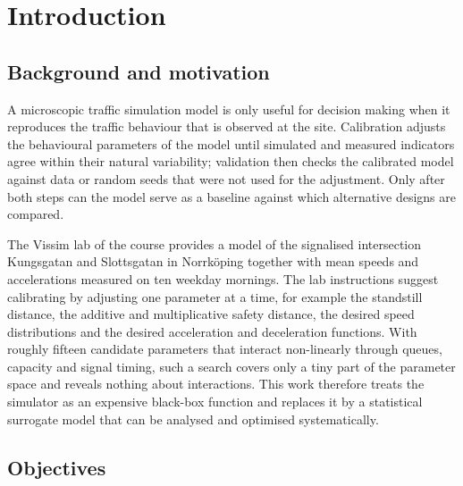\documentclass[11pt,a4paper]{article}
\begin{document}
\tableofcontents
\listoffigures
\listoftables
\newpage

\section{Introduction}
\label{sec:intro}

\subsection{Background and motivation}

A microscopic traffic simulation model is only useful for decision making when it reproduces the
traffic behaviour that is observed at the site. Calibration adjusts the behavioural parameters of
the model until simulated and measured indicators agree within their natural variability;
validation then checks the calibrated model against data or random seeds that were not used for
the adjustment. Only after both steps can the model serve as a baseline against which alternative
designs are compared.

The Vissim lab of the course provides a model of the signalised intersection Kungsgatan and
Slottsgatan in Norrk\"oping together with mean speeds and accelerations measured on ten weekday
mornings. The lab instructions suggest calibrating by adjusting one parameter at a time, for
example the standstill distance, the additive and multiplicative safety distance, the desired speed
distributions and the desired acceleration and deceleration functions. With roughly fifteen
candidate parameters that interact non-linearly through queues, capacity and signal timing, such a
search covers only a tiny part of the parameter space and reveals nothing about interactions. This
work therefore treats the simulator as an expensive black-box function and replaces it by a
statistical surrogate model that can be analysed and optimised systematically.

\subsection{Objectives}
\end{document}
